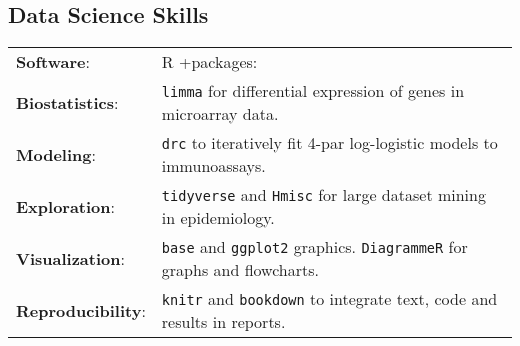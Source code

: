 \documentclass[margin,line]{res}
\begin{document}
\begin{resume}
\section{\sc Data Science Skills}%
\begin{tabular}{ l l }
	{\bf Software}: &  R +packages:\\ %
	{\bf Biostatistics}: & \texttt{limma} for differential expression of genes in microarray data.\\ 
	{\bf Modeling}: & \texttt{drc} to iteratively fit 4-par log-logistic models to immunoassays.\\
	{\bf Exploration}: & \texttt{tidyverse} and \texttt{Hmisc} for large dataset mining in epidemiology.\\
	{\bf Visualization}: & \texttt{base} and \texttt{ggplot2} graphics. \texttt{DiagrammeR} for graphs and flowcharts.\\ 
	{\bf Reproducibility}: & \texttt{knitr} and \texttt{bookdown} to integrate text, code and results in reports.
\end{tabular}


\end{resume}
\end{document}
